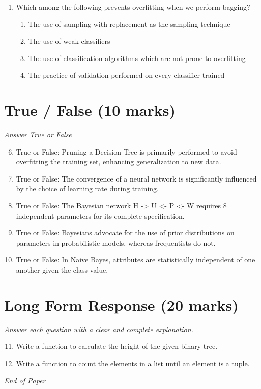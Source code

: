 \documentclass[12pt]{article}
\begin{document}
\begin{enumerate}[label=\arabic*.]
\begin{enumerate}[label=(\alph*)]
    \item True, True
    \item False, False
    \item True, False
    \item False, True
\end{enumerate}
\item Which among the following prevents overfitting when we perform bagging?
\begin{enumerate}[label=(\alph*)]
    \item The use of sampling with replacement as the sampling technique
    \item The use of weak classifiers
    \item The use of classification algorithms which are not prone to overfitting
    \item The practice of validation performed on every classifier trained
\end{enumerate}
\end{enumerate}

\section*{True / False (10 marks)}
\textit{Answer True or False}
\begin{enumerate}[label=\arabic*.]
\setcounter{enumi}{5}
\item True or False: Pruning a Decision Tree is primarily performed to avoid overfitting the training set, enhancing generalization to new data.
\item True or False: The convergence of a neural network is significantly influenced by the choice of learning rate during training.
\item True or False: The Bayesian network H -\textgreater{} U \textless{}- P \textless{}- W requires 8 independent parameters for its complete specification.
\item True or False: Bayesians advocate for the use of prior distributions on parameters in probabilistic models, whereas frequentists do not.
\item True or False: In Naive Bayes, attributes are statistically independent of one another given the class value.
\end{enumerate}

\section*{Long Form Response (20 marks)}
\textit{Answer each question with a clear and complete explanation.}
\begin{enumerate}[label=\arabic*.]
\setcounter{enumi}{10}
\item Write a function to calculate the height of the given binary tree.
\item Write a function to count the elements in a list until an element is a tuple.
\end{enumerate}

\vfill
\noindent\textit{End of Paper}
\end{document}
